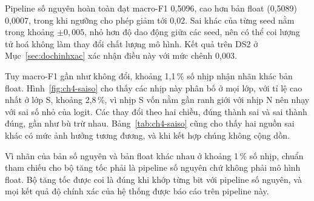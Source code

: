 Pipeline số nguyên hoàn toàn đạt macro-F1 0{,}5096, cao hơn bản float (0{,}5089) 0{,}0007, trong khi ngưỡng cho phép giảm tới 0{,}02.
Sai khác của từng seed nằm trong khoảng $\pm0{,}005$, nhỏ hơn độ dao động giữa các seed, nên có thể coi lượng tử hoá không làm thay đổi chất lượng mô hình.
Kết quả trên DS2 ở Mục~\ref{sec:dochinhxac} xác nhận điều này với mức chênh 0{,}003.

Tuy macro-F1 gần như không đổi, khoảng 1{,}1\,\% số nhịp nhận nhãn khác bản float.
Hình~\ref{fig:ch4-saiso} cho thấy các nhịp này phân bố ở mọi lớp, với tỉ lệ cao nhất ở lớp S, khoảng 2{,}8\,\%, vì nhịp S vốn nằm gần ranh giới với nhịp N nên nhạy với sai số nhỏ của logit.
Các thay đổi theo hai chiều, đúng thành sai và sai thành đúng, gần như bù trừ nhau.
Bảng~\ref{tab:ch4-saiso} cũng cho thấy hai nguồn sai khác có mức ảnh hưởng tương đương, và khi kết hợp chúng không cộng dồn.

Vì nhãn của bản số nguyên và bản float khác nhau ở khoảng 1\,\% số nhịp, chuẩn tham chiếu cho bộ tăng tốc phải là pipeline số nguyên chứ không phải mô hình float.
Bộ tăng tốc được coi là đúng khi khớp từng bit với pipeline số nguyên, và mọi kết quả độ chính xác của hệ thống được báo cáo trên pipeline này.
